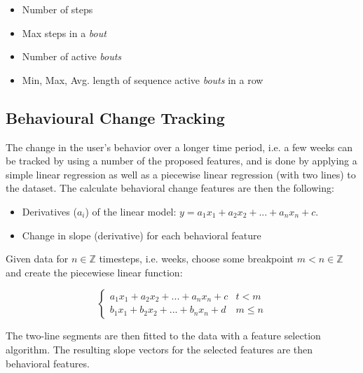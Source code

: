 \begin{itemize}
    \item Number of steps
    \item Max steps in a \textit{bout}
    \item Number of active \textit{bouts}
    \item Min, Max, Avg. length of sequence active \textit{bouts} in a row
\end{itemize}
    
\subsection{Behavioural Change Tracking}
The change in the user's behavior over a longer time period, i.e. a few weeks can be tracked by using a number of the proposed features, and is done by applying a simple linear regression as well as a piecewise linear regression (with two lines) to the dataset. The calculate behavioral change features are then the following:

\begin{itemize}
    \item Derivatives ($a_i$) of the linear model: $y=a_1 x_1 + a_2 x_2 + ... + a_n x_n + c$.
    \item Change in slope (derivative) for each behavioral feature
\end{itemize}

Given data for $n \in \mathbb{Z}$ timesteps, i.e. weeks, choose some breakpoint $m < n \in \mathbb{Z}$ and create the piecewiese linear function:

\[ \begin{cases} 
      a_1 x_1 + a_2 x_2 + ... + a_n x_n + c & t <    m \\
      b_1 x_1 + b_2 x_2 + ... + b_n x_n + d & m \leq n 
   \end{cases}
\]

The two-line segments are then fitted to the data with a feature selection algorithm. The resulting slope vectors for the selected features are then behavioral features.


